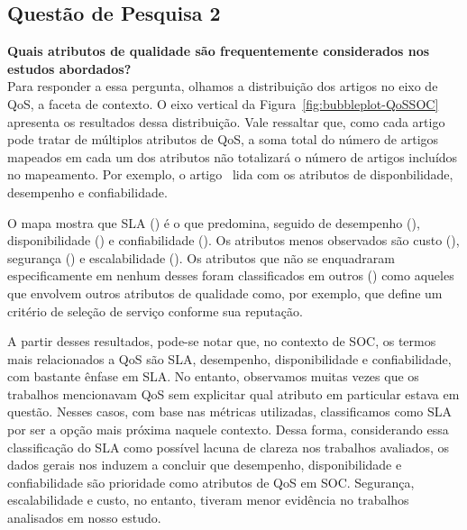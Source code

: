 \subsection{Quest\~{a}o de Pesquisa 2}
\textbf{Quais atributos de qualidade são frequentemente considerados nos estudos abordados?}
\\[0.01in]

Para responder a essa pergunta, olhamos a distribui\c{c}\~{a}o dos artigos no eixo de QoS, a faceta de contexto. O eixo vertical da Figura~\ref{fig:bubbleplot-QoSSOC} apresenta os resultados dessa distribui\c{c}\~{a}o. Vale ressaltar que, como cada artigo pode tratar de m\'{u}ltiplos atributos de QoS, a soma total do n\'{u}mero de artigos mapeados em cada um dos atributos n\~{a}o totalizar\'{a} o n\'{u}mero de artigos inclu\'{i}dos no mapeamento. Por exemplo, o artigo~\cite{DBLP:journals/tse/CalinescuGKMT11} lida com os atributos de disponbilidade, desempenho e confiabilidade. 

O mapa mostra que SLA (\SLA) \'{e} o que predomina, seguido de desempenho (\Desempenho), disponibilidade (\Disponibilidade) e confiabilidade (\Confiabilidade). Os atributos menos observados s\~{a}o custo (\Custo), seguran\c{c}a (\Seguranca) e escalabilidade (\Escalabilidade). Os atributos que n\~{a}o se enquadraram especificamente em nenhum desses foram classificados em outros (\Outros) como aqueles que envolvem outros atributos de qualidade como, por exemplo, \cite{6036406} que define um crit\'{e}rio de sele\c{c}\~{a}o de servi\c{c}o conforme sua reputa\c{c}\~{a}o. 

A partir desses resultados, pode-se notar que, no contexto de SOC, os termos mais relacionados a QoS s\~{a}o SLA, desempenho, disponibilidade e confiabilidade, com bastante \^{e}nfase em SLA. No entanto, observamos muitas vezes que os trabalhos mencionavam QoS sem explicitar qual atributo em particular estava em quest\~{a}o. Nesses casos, com base nas m\'{e}tricas utilizadas, classificamos como SLA por ser a op\c{c}\~{a}o mais pr\'{o}xima naquele contexto. Dessa forma, considerando essa classifica\c{c}\~{a}o do SLA como poss\'{i}vel lacuna de clareza nos trabalhos avaliados, os dados gerais nos induzem a concluir que desempenho, disponibilidade e confiabilidade s\~{a}o prioridade como atributos de QoS em SOC. Seguran\c{c}a, escalabilidade e custo, no entanto, tiveram menor evid\^{e}ncia no trabalhos analisados em nosso estudo.